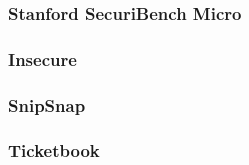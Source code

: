 \subsubsection{Stanford SecuriBench Micro}



\subsubsection{Insecure}



\subsubsection{SnipSnap}



\subsubsection{Ticketbook}

